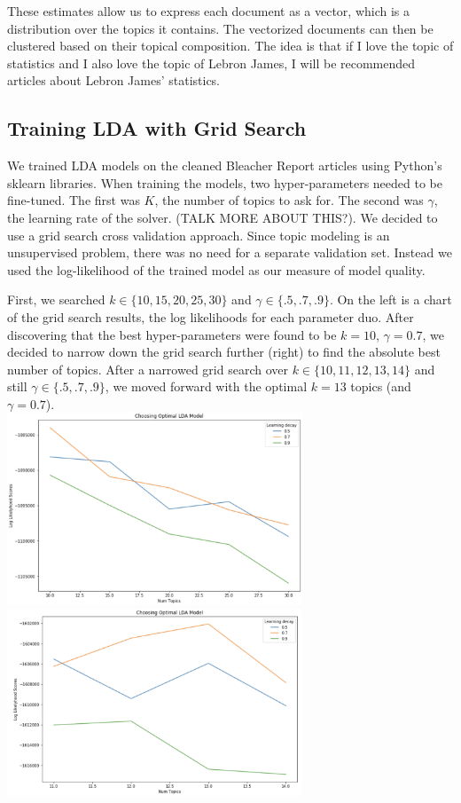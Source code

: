\documentclass[11pt]{article}
\begin{document}
These estimates allow us to express each document as a vector, which is a distribution over the topics it contains.  The vectorized documents can then be clustered based on their topical composition. The idea is that if I love the topic of statistics and I also love the topic of Lebron James, I will be recommended articles about Lebron James' statistics. 

\subsection{Training LDA with Grid Search}
We trained LDA models on the cleaned Bleacher Report articles using Python's sklearn libraries.  When training the models, two hyper-parameters needed to be fine-tuned. The first was $K$, the number of topics to ask for.  The second was $\gamma$, the learning rate of the solver.  (TALK MORE ABOUT THIS?). We decided to use a grid search cross validation approach. Since topic modeling is an unsupervised problem, there was no need for a separate validation set.  Instead we used the log-likelihood of the trained model as our measure of model quality. 

First, we searched $k \in \{10, 15, 20, 25, 30\}$ and $\gamma \in \{.5, .7, .9\}$. On the left is a chart of the grid search results, the log likelihoods for each parameter duo. After discovering that the best hyper-parameters were found to be $k=10$, $\gamma = 0.7$, we decided to narrow down the grid search further (right) to find the absolute best number of topics.  After a narrowed grid search over $k \in \{10, 11, 12, 13, 14\}$ and still $\gamma \in \{.5, .7, .9\}$, we moved forward with the optimal $k=13$ topics (and $\gamma = 0.7$). \\

\includegraphics[width=250pt]{gridsearch.png} \includegraphics[width=250pt]{gridsearch2.png} 
\end{document}
